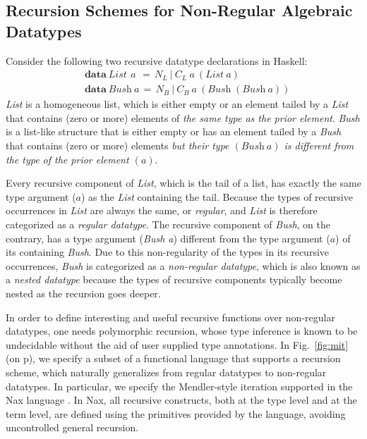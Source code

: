 \documentclass[runningheads,a4paper]{llncs}
\begin{document}
\subsection{Recursion Schemes for Non-Regular Algebraic Datatypes}
\label{ssec:mit}
Consider the following two recursive datatype declarations in Haskell:
\begin{align*}
& \textbf{data}~\textit{List}~\,a~
      \,=\, N_{\!L}
       ~|~  C_{\!L}~a~(\textit{List}~a)\\
& \textbf{data}~\textit{Bush}~a
      \,=\, N_{\!B}
       ~|~  C_{\!B}~a~(\textit{Bush}\;(\textit{Bush}~a))
\end{align*}
\textit{List} is a homogeneous list, which is either empty
or an element tailed by a \textit{List} that contains (zero or more)
elements of \emph{the same type as the prior element}.
\textit{Bush} is a list-like structure that is either empty
or has an element tailed by a \textit{Bush} that contains (zero or more) 
elements \emph{but their type $(\textit{Bush}~a)$ is different from 
the type of the prior element $(a)$}.

Every recursive component of \textit{List}, which is the tail of a list,
has exactly the same type argument ($a$) as the \textit{List} containing
the tail. Because the types of recursive occurrences in \textit{List} are
always the same, or \emph{regular}, and \textit{List} is therefore categorized
as a \emph{regular datatype}. The recursive component of \textit{Bush},
on the contrary, has a type argument (\textit{Bush a}) different from
the type argument ($a$) of its containing \textit{Bush}. Due to this
non-regularity of the types in its recursive occurrences, \emph{Bush} is
categorized as a \emph{non-regular datatype}, which is also known as
a \emph{nested datatype}\;\cite{BirMee98} because the types of recursive
components typically become nested as the recursion goes deeper.

In order to define interesting and useful recursive functions over
non-regular datatypes, one needs polymorphic recursion, whose 
type inference is known to be undecidable without the aid of
user supplied type annotations. In Fig.~\ref{fig:mit} (on p\pageref{fig:mit}),
we specify a subset of a functional language that supports a recursion scheme,
which naturally generalizes from regular datatypes to non-regular datatypes.
In particular, we specify
the Mendler-style iteration \cite{matthes98phd,AbeMatUus03}
supported in the Nax language \cite{Ahn14thesis}. In Nax,
all recursive constructs, both at the type level and at the term level,
are defined using the primitives provided by the language, avoiding
uncontrolled general recursion.
\end{document}

